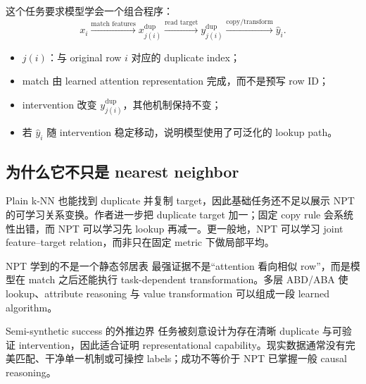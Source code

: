 \documentclass[a4paper]{article}
\begin{document}
这个任务要求模型学会一个组合程序：
\[
x_i\xrightarrow{\text{match features}}
x_{j(i)}^{\mathrm{dup}}
\xrightarrow{\text{read target}}
y_{j(i)}^{\mathrm{dup}}
\xrightarrow{\text{copy/transform}}
\widehat y_i.
\]

\begin{itemize}
  \item $j(i)$：与 original row $i$ 对应的 duplicate index；
  \item match 由 learned attention representation 完成，而不是预写 row ID；
  \item intervention 改变 $y_{j(i)}^{\mathrm{dup}}$，其他机制保持不变；
  \item 若 $\widehat y_i$ 随 intervention 稳定移动，说明模型使用了可泛化的 lookup path。
\end{itemize}


\subsection{为什么它不只是 nearest neighbor}

Plain k-NN 也能找到 duplicate 并复制 target，因此基础任务还不足以展示 NPT 的可学习关系变换。作者进一步把 duplicate target 加一；固定 copy rule 会系统性出错，而 NPT 可以学习先 lookup 再减一。更一般地，NPT 可以学习 joint feature--target relation，而非只在固定 metric 下做局部平均。

\begin{importantbox}{NPT 学到的不是一个静态邻居表}
最强证据不是“attention 看向相似 row”，而是模型在 match 之后还能执行 task-dependent transformation。多层 ABD/ABA 使 lookup、attribute reasoning 与 value transformation 可以组成一段 learned algorithm。
\end{importantbox}


\begin{warningbox}{Semi-synthetic success 的外推边界}
任务被刻意设计为存在清晰 duplicate 与可验证 intervention，因此适合证明 representational capability。现实数据通常没有完美匹配、干净单一机制或可操控 labels；成功不等价于 NPT 已掌握一般 causal reasoning。
\end{warningbox}
\end{document}
